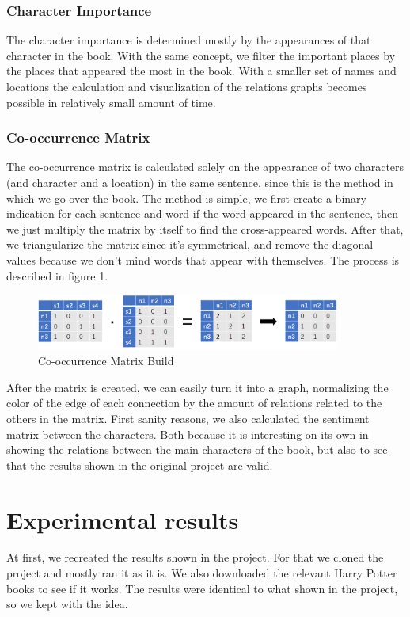\documentclass{article}
\begin{document}
\subsubsection{Character Importance}
The character importance is determined mostly by the appearances of that character in the book. With the same concept, we filter the important places by the places that appeared the most in the book. With a smaller set of names and locations the calculation and visualization of the relations graphs becomes possible in relatively small amount of time.
\subsubsection{Co-occurrence Matrix}
The co-occurrence matrix is calculated solely on the appearance of two characters (and character and a location) in the same sentence, since this is the method in which we go over the book. The method is simple, we first create a binary indication for each sentence and word if the word appeared in the sentence, then we just multiply the matrix by itself to find the cross-appeared words. After that, we triangularize the matrix since it's symmetrical, and remove the diagonal values because we don't mind words that appear with themselves. The process is described in figure 1.
\begin{figure}[h]
  \centering
  \includegraphics[width=10cm]{co-occurences_defintion.png}
  \caption{Co-occurrence Matrix Build}
  \label{fig1}
\end{figure}
After the matrix is created, we can easily turn it into a graph, normalizing the color of the edge of each connection by the amount of relations related to the others in the matrix. First sanity reasons, we also calculated the sentiment matrix between the characters. Both because it is interesting on its own in showing the relations between the main characters of the book, but also to see that the results shown in the original project are valid.

\section{Experimental results}
At first, we recreated the results shown in the project. For that we cloned the project and mostly ran it as it is. We also downloaded the relevant Harry Potter books to see if it works. The results were identical to what shown in the project, so we kept with the idea.
\end{document}
